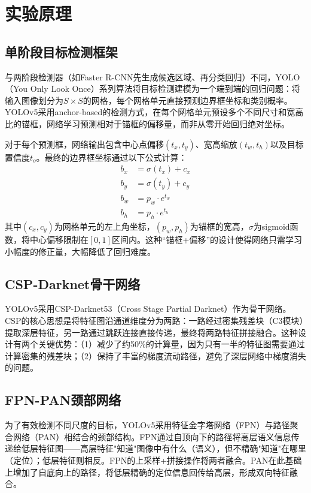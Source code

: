 \documentclass[12pt,a4paper]{article}
\begin{document}
\section{实验原理}

\subsection{单阶段目标检测框架}

与两阶段检测器（如Faster R-CNN先生成候选区域、再分类回归）不同，YOLO（You Only Look Once）系列算法将目标检测建模为一个端到端的回归问题：将输入图像划分为$S \times S$的网格，每个网格单元直接预测边界框坐标和类别概率。YOLOv5采用anchor-based的检测方式，在每个网格单元预设多个不同尺寸和宽高比的锚框，网络学习预测相对于锚框的偏移量，而非从零开始回归绝对坐标。

对于每个预测框，网络输出包含中心点偏移$(t_x, t_y)$、宽高缩放$(t_w, t_h)$以及目标置信度$t_o$。最终的边界框坐标通过以下公式计算：
\begin{align}
b_x &= \sigma(t_x) + c_x \\
b_y &= \sigma(t_y) + c_y \\
b_w &= p_w \cdot e^{t_w} \\
b_h &= p_h \cdot e^{t_h}
\end{align}
其中$(c_x, c_y)$为网格单元的左上角坐标，$(p_w, p_h)$为锚框的宽高，$\sigma$为sigmoid函数，将中心偏移限制在$[0,1]$区间内。这种“锚框+偏移”的设计使得网络只需学习小幅度的修正量，大幅降低了回归难度。

\subsection{CSP-Darknet骨干网络}

YOLOv5采用CSP-Darknet53（Cross Stage Partial Darknet）作为骨干网络。CSP的核心思想是将特征图沿通道维度分为两路：一路经过密集残差块（C3模块）提取深层特征，另一路通过跳跃连接直接传递，最终将两路特征拼接融合。这种设计有两个关键优势：（1）减少了约50\%的计算量，因为只有一半的特征图需要通过计算密集的残差块；（2）保持了丰富的梯度流动路径，避免了深层网络中梯度消失的问题。

\subsection{FPN-PAN颈部网络}

为了有效检测不同尺度的目标，YOLOv5采用特征金字塔网络（FPN）与路径聚合网络（PAN）相结合的颈部结构。FPN通过自顶向下的路径将高层语义信息传递给低层特征图——高层特征"知道"图像中有什么（语义），但不精确"知道"在哪里（定位）；低层特征则相反。FPN的上采样+拼接操作将两者融合。PAN在此基础上增加了自底向上的路径，将低层精确的定位信息回传给高层，形成双向特征融合。
\end{document}
